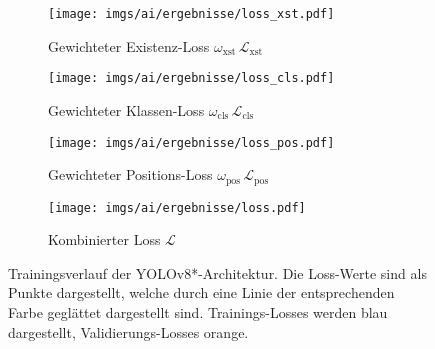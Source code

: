 \begin{figure}
    \centering
    \begin{subfigure}{\linewidth}
        \raggedleft
        \texttt{[image: imgs/ai/ergebnisse/loss\_xst.pdf]}
        \hspace{2.3cm}
        \caption{Gewichteter Existenz-Loss $\omega_\text{xst}\,\mathcal{L}_\text{xst}$}
    \end{subfigure}
    \vspace{0.1cm}
    \par

    \begin{subfigure}{\linewidth}
        \raggedleft
        \texttt{[image: imgs/ai/ergebnisse/loss\_cls.pdf]}
        \hspace{2.3cm}
        \caption{Gewichteter Klassen-Loss $\omega_\text{cls}\,\mathcal{L}_\text{cls}$}
    \end{subfigure}
    \vspace{0.1cm}
    \par

    \begin{subfigure}{\linewidth}
        \raggedleft
        \texttt{[image: imgs/ai/ergebnisse/loss\_pos.pdf]}
        \hspace{2.3cm}
        \caption{Gewichteter Positions-Loss $\omega_\text{pos}\,\mathcal{L}_\text{pos}$}
    \end{subfigure}
    \vspace{0.1cm}
    \par

    \begin{subfigure}{\linewidth}
        \raggedleft
        \texttt{[image: imgs/ai/ergebnisse/loss.pdf]}
        \hspace{2.3cm}
        \caption{Kombinierter Loss $\mathcal{L}$}
    \end{subfigure}

    \caption{Trainingsverlauf der YOLOv8*-Architektur. Die Loss-Werte sind als Punkte dargestellt, welche durch eine Linie der entsprechenden Farbe geglättet dargestellt sind. Trainings-Losses werden blau dargestellt, Validierungs-Losses orange.}
    \label{img:trainingsverlauf}
\end{figure}



